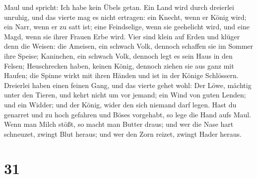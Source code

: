 Maul und spricht: Ich habe kein Übels getan.  Ein Land wird
durch dreierlei unruhig, und das vierte mag es nicht ertragen:
 ein Knecht, wenn er König wird; ein Narr, wenn er zu satt
ist;  eine Feindselige, wenn sie geehelicht wird, und eine
Magd, wenn sie ihrer Frauen Erbe wird.  Vier sind klein auf
Erden und klüger denn die Weisen:  die Ameisen, ein schwach
Volk, dennoch schaffen sie im Sommer ihre Speise; 
Kaninchen, ein schwach Volk, dennoch legt es sein Haus in den Felsen;
 Heuschrecken haben, keinen König, dennoch ziehen sie aus
ganz mit Haufen;  die Spinne wirkt mit ihren Händen und ist
in der Könige Schlössern.  Dreierlei haben einen feinen
Gang, und das vierte gehet wohl:  Der Löwe, mächtig unter
den Tieren, und kehrt nicht um vor jemand;  ein Wind von
guten Lenden; und ein Widder; und der König, wider den sich niemand darf
legen.  Hast du genarret und zu hoch gefahren und Böses
vorgehabt, so lege die Hand aufs Maul.  Wenn man Milch
stößt, so macht man Butter draus; und wer die Nase hart schneuzet,
zwingt Blut heraus; und wer den Zorn reizet, zwingt Hader heraus.

\hypertarget{section-30}{%
\section{31}\label{section-30}}

